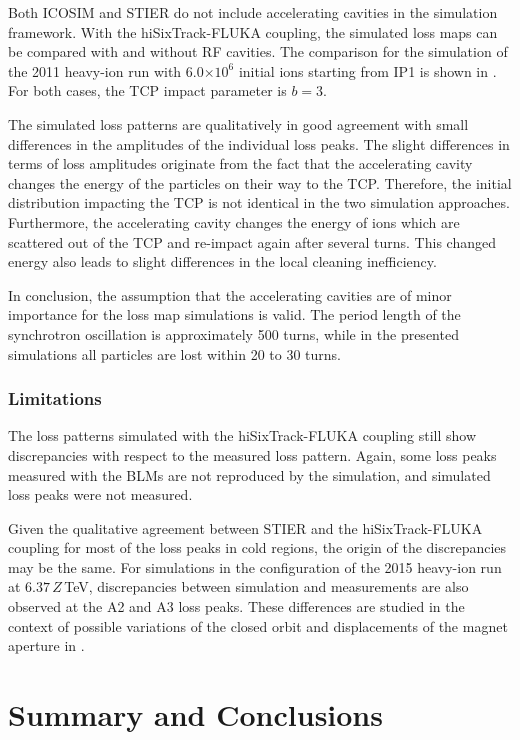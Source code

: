 Both ICOSIM and STIER do not include accelerating cavities in the simulation framework. With the hiSixTrack-FLUKA coupling, the simulated loss maps can be compared with and without RF cavities. The comparison for the simulation of the 2011 heavy-ion run with 6.0$\times 10^6$ initial \lead ions starting from IP1 is shown in . For both cases, the TCP impact parameter is $b=3$\mum.

The simulated loss patterns are qualitatively in good agreement with small differences in the amplitudes of the individual loss peaks. The slight differences in terms of loss amplitudes originate from the fact that the accelerating cavity changes the energy of the particles on their way to the TCP. Therefore, the initial distribution impacting the TCP is not identical in the two simulation approaches. Furthermore, the accelerating cavity changes the energy of ions which are scattered out of the TCP and re-impact again after several turns. This changed energy also leads to slight differences in the local cleaning inefficiency. 

In conclusion, the assumption that the accelerating cavities are of minor importance for the loss map simulations is valid. The period length of the synchrotron oscillation is approximately 500 turns, while in the presented simulations all particles are lost within 20 to 30 turns.


\subsubsection{Limitations}

The loss patterns simulated with the hiSixTrack-FLUKA coupling still show discrepancies with respect to the measured loss pattern. Again, some loss peaks measured with the BLMs are not reproduced by the simulation, and simulated loss peaks were not measured.  

Given the qualitative agreement between STIER and the hiSixTrack-FLUKA coupling for most of the loss peaks in cold regions, the origin of the discrepancies may be the same. For simulations in the configuration of the 2015 heavy-ion run at $6.37\,Z\,$TeV, discrepancies between simulation and measurements are also observed at the A2 and A3 loss peaks. These differences are studied in the context of possible variations of the closed orbit and displacements of the magnet aperture in .




\section{Summary and Conclusions}


